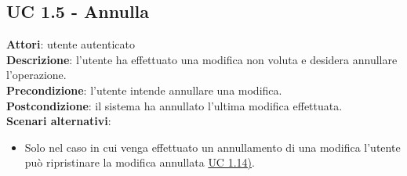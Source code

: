 \subsection{UC 1.5 - Annulla}{
	\label{uc1.5}
	\textbf{Attori}: utente autenticato \\
	\textbf{Descrizione}: l'utente ha effettuato una modifica non voluta e desidera annullare l'operazione. \\
	\textbf{Precondizione}: l'utente intende annullare una modifica.	\\
	\textbf{Postcondizione}: il sistema ha annullato l'ultima modifica effettuata.	\\
	\textbf{Scenari alternativi}: 
	\begin{itemize}
		\item Solo nel caso in cui venga effettuato un annullamento di una modifica l'utente può ripristinare la modifica annullata \hyperref[uc1.14]{UC 1.14)}.
	\end{itemize}
	}
